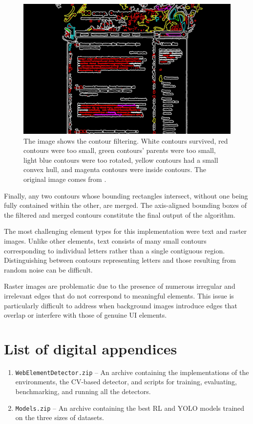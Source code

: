\documentclass[
  digital,     %
  oneside,     %
  nosansbold,  %
  nocolorbold, %
  lof,         %
  lot,         %
]{fithesis4}
\begin{document}
\begin{figure}
    \centering
    \includegraphics[width=1\linewidth]{diagrams/filter.jpg}
    \caption{The image shows the contour filtering. White contours survived, red contours were too small, green contours' parents were too small, light blue contours were too rotated, yellow contours had a small convex hull, and magenta contours were inside contours. The original image comes from \cite{aydos2020}.}
    \label{fig:filtering}
\end{figure}

Finally, any two contours whose bounding rectangles intersect, without one being fully contained within the other, are merged. The axis-aligned bounding boxes of the filtered and merged contours constitute the final output of the algorithm.

The most challenging element types for this implementation were text and raster images. Unlike other elements, text consists of many small contours corresponding to individual letters rather than a single contiguous region. Distinguishing between contours representing letters and those resulting from random noise can be difficult.

Raster images are problematic due to the presence of numerous irregular and irrelevant edges that do not correspond to meaningful elements. This issue is particularly difficult to address when background images introduce edges that overlap or interfere with those of genuine UI elements.

\chapter{List of digital appendices}

\begin{enumerate}
    \item \texttt{WebElementDetector.zip} -- An archive containing the implementations of the environments, the CV-based detector, and scripts for training, evaluating, benchmarking, and running all the detectors.
    \item \texttt{Models.zip} -- An archive containing the best RL and YOLO models trained on the three sizes of datasets.
\end{enumerate}
\end{document}
